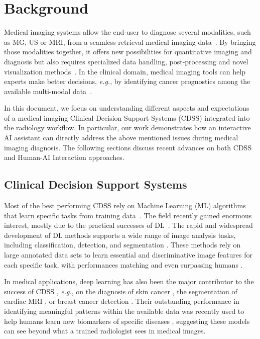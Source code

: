 \section{Background}
\label{sec:sec002}

Medical imaging systems allow the end-user to diagnose several modalities\footnotemark[1], such as MG, US or MRI, from a seamless retrieval medical imaging data~\cite{faraji2019radiologic}.
By bringing those modalities together, it offers new possibilities for quantitative imaging and diagnosis but also requires specialized data handling, post-processing and novel visualization methods~\cite{Igarashi:2016:IVS:2984511.2984537}.
In the clinical domain, medical imaging tools can help experts make better decisions, {\it e.g.}, by identifying cancer prognostics among the available multi-modal data~\cite{Lopes:2017:UHC:3143820.3144118}.

In this document, we focus on understanding different aspects and expectations of a medical imaging Clinical Decision Support Systems (CDSS) integrated into the radiology workflow.
In particular, our work demonstrates how an interactive AI assistant can directly address the above mentioned issues during medical imaging diagnosis.
The following sections discuss recent advances on both CDSS and Human-AI Interaction approaches.

\subsection{Clinical Decision Support Systems}
\label{sec:sec00201}

Most of the best performing CDSS rely on Machine Learning (ML) algorithms that learn specific tasks from training data~\cite{calisto2020breastscreening}.
The field recently gained enormous interest, mostly due to the practical successes of DL~\cite{10.1007/978-3-030-22871-2_67}.
The rapid and widespread development of DL methods supports a wide range of image analysis tasks, including classification, detection, and segmentation \cite{lecun2015deep}.
These methods rely on large annotated data sets to learn essential and discriminative image features for each specific task, with performances matching and even surpassing humans \cite{esteva2017dermatologist}.

In medical applications, deep learning has also been the major contributor to the success of CDSS \cite{esteva2019guide}, \textit{e.g.}, on the diagnosis of skin cancer \cite{esteva2017dermatologist}, the segmentation of cardiac MRI \cite{8759179}, or breast cancer detection \cite{MAICAS2019101562}.
Their outstanding performance in identifying meaningful patterns within the available data was recently used to help humans learn new biomarkers of specific diseases \cite{ wang2019deep}, suggesting these models can see beyond what a trained radiologist sees in medical images.

